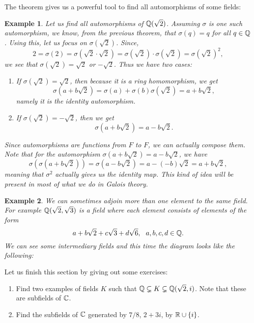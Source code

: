 \documentclass[12pt]{article}
\theoremstyle{plain}
\newtheorem{example}{Example}
\theoremstyle{definition}
\theoremstyle{remark}
\begin{document}
The theorem gives us a powerful tool to find all automorphisms of some fields:
\begin{example}
Let us find all automorphisms of $\mathbb{Q}(\sqrt{2})$. Assuming $\sigma$ is one such automorphism, we know, from the previous theorem, that $\sigma(q)=q$ for all $q\in \mathbb{Q}$. Using this, let us focus on $\sigma(\sqrt{2})$. 
Since,
$$2=\sigma(2) = \sigma (\sqrt{2}\cdot \sqrt{2}) = \sigma(\sqrt{2})\cdot \sigma(\sqrt{2}) = \sigma(\sqrt{2})^2,$$
we see that $\sigma(\sqrt{2})=\sqrt{2}$ or $-\sqrt{2}$. 
Thus we have two cases:
\begin{enumerate}
    \item If $\sigma(\sqrt{2})=\sqrt{2}$, then because it is a ring homomorphism, we get 
    $$\sigma(a+b\sqrt{2})=\sigma(a)+\sigma(b)\sigma(\sqrt{2})=a+b\sqrt{2},$$ namely it is the identity automorphism. 
    \item If $\sigma(\sqrt{2})=-\sqrt{2}$, then we get 
    $$\sigma(a+b\sqrt{2}) = a-b\sqrt{2}.$$
\end{enumerate}
Since automorphisms are functions from $F$ to $F$, we can actually compose them. Note that for the automorphism $\sigma(a+b\sqrt{2}) = a-b\sqrt{2}$, we have 
$$\sigma(\sigma(a+b\sqrt{2})) = \sigma(a-b\sqrt{2}) = a-(-b)\sqrt{2}=a+b\sqrt{2},$$
meaning that $\sigma^2$ actually gives us the identity map. 
This kind of idea will be present in most of what we do in Galois theory.
\end{example}

\begin{example}
We can sometimes adjoin more than one element to the same field. For example $\mathbb{Q}(\sqrt{2}, \sqrt{3})$ is a field where each element consists of elements of the form 
$$a+b\sqrt{2}+c\sqrt{3}+d\sqrt{6}, \:\:\:a,b,c,d\in \mathbb{Q}.$$
We can see some intermediary fields and this time the diagram looks like the following:

    
\end{example}

Let us finish this section by giving out some exercises:
\begin{enumerate}
    \item Find two examples of fields $K$ such that $\mathbb{Q} \subsetneq K \subsetneq \mathbb{Q}(\sqrt{2},i)$. Note that these are subfields of $\mathbb{C}$.
    \item Find the subfields of $\mathbb{C}$ generated by $7/8$, $2+3i$, by $\mathbb{R} \cup \{i\}$.
\end{enumerate}
\end{document}

